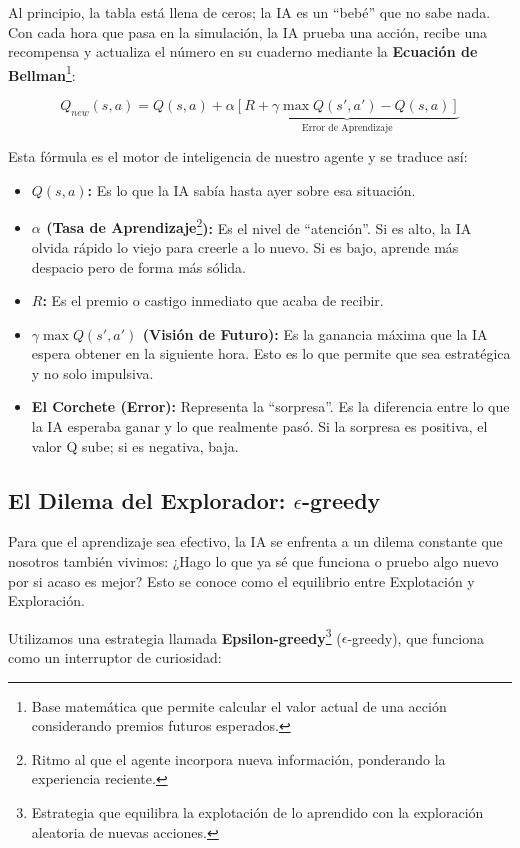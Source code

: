 \documentclass[12pt,a4paper]{article}
\begin{document}
Al principio, la tabla está llena de ceros; la IA es un ``bebé'' que no sabe nada. Con cada hora que pasa en la simulación, la IA prueba una acción, recibe una recompensa y actualiza el número en su cuaderno mediante la \textbf{Ecuación de Bellman}\footnote{Base matemática que permite calcular el valor actual de una acción considerando premios futuros esperados.}:

\begin{equation}
    Q_{new}(s, a) = Q(s, a) + \alpha \underbrace{[R + \gamma \max Q(s', a') - Q(s, a)]}_{\text{Error de Aprendizaje}}
\end{equation}

Esta fórmula es el motor de inteligencia de nuestro agente y se traduce así:
\begin{itemize}
    \item \textbf{$Q(s, a)$:} Es lo que la IA sabía hasta ayer sobre esa situación.
    \item \textbf{$\alpha$ (Tasa de Aprendizaje}\footnote{Ritmo al que el agente incorpora nueva información, ponderando la experiencia reciente.}\textbf{):} Es el nivel de ``atención''. Si es alto, la IA olvida rápido lo viejo para creerle a lo nuevo. Si es bajo, aprende más despacio pero de forma más sólida.
    \item \textbf{$R$:} Es el premio o castigo inmediato que acaba de recibir.
    \item \textbf{$\gamma \max Q(s', a')$ (Visión de Futuro):} Es la ganancia máxima que la IA espera obtener en la siguiente hora. Esto es lo que permite que sea estratégica y no solo impulsiva.
    \item \textbf{El Corchete (Error):} Representa la ``sorpresa''. Es la diferencia entre lo que la IA esperaba ganar y lo que realmente pasó. Si la sorpresa es positiva, el valor Q sube; si es negativa, baja.
\end{itemize}

\subsection{El Dilema del Explorador: $\epsilon$-greedy}

Para que el aprendizaje sea efectivo, la IA se enfrenta a un dilema constante que nosotros también vivimos: ¿Hago lo que ya sé que funciona o pruebo algo nuevo por si acaso es mejor? Esto se conoce como el equilibrio entre Explotación y Exploración.

Utilizamos una estrategia llamada \textbf{Epsilon-greedy}\footnote{Estrategia que equilibra la explotación de lo aprendido con la exploración aleatoria de nuevas acciones.} ($\epsilon$-greedy), que funciona como un interruptor de curiosidad:
\end{document}
